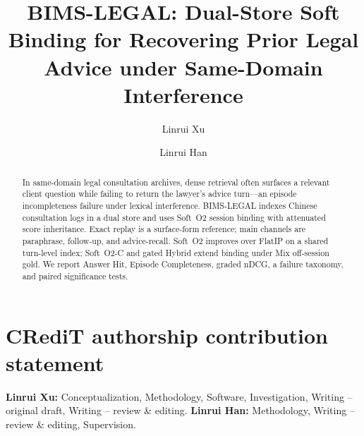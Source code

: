 \documentclass[preprint,12pt,authoryear]{elsarticle}
\begin{document}
\begin{frontmatter}
\title{BIMS-LEGAL: Dual-Store Soft Binding for Recovering Prior Legal Advice under Same-Domain Interference}

\author[uw]{Linrui Xu}

\author[lab,idl]{Linrui Han}




\begin{abstract}
In same-domain legal consultation archives, dense retrieval often surfaces a relevant client question while failing to return the lawyer's advice turn---an episode incompleteness failure under lexical interference. BIMS-LEGAL indexes Chinese consultation logs in a dual store and uses Soft~O2 session binding with attenuated score inheritance. Exact replay is a surface-form reference; main channels are paraphrase, follow-up, and advice-recall. Soft~O2 improves over FlatIP on a shared turn-level index; Soft~O2-C and gated Hybrid extend binding under Mix off-session gold. We report Answer Hit, Episode Completeness, graded nDCG, a failure taxonomy, and paired significance tests.
\end{abstract}
\end{frontmatter}

\section*{CRediT authorship contribution statement}
\textbf{Linrui Xu:} Conceptualization, Methodology, Software, Investigation, Writing -- original draft, Writing -- review \& editing.
\textbf{Linrui Han:} Methodology, Writing -- review \& editing, Supervision.
\end{document}
